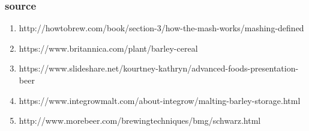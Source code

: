 \documentclass{beamer}
\begin{document}
\begin{frame}
  \frametitle{source}
  \begin{enumerate}
  \item http://howtobrew.com/book/section-3/how-the-mash-works/mashing-defined
  \item https://www.britannica.com/plant/barley-cereal
  \item https://www.slideshare.net/kourtney-kathryn/advanced-foods-presentation-beer
  \item https://www.integrowmalt.com/about-integrow/malting-barley-storage.html
  \item http://www.morebeer.com/brewingtechniques/bmg/schwarz.html

  \end{enumerate}
  \end{frame}
\end{document}
